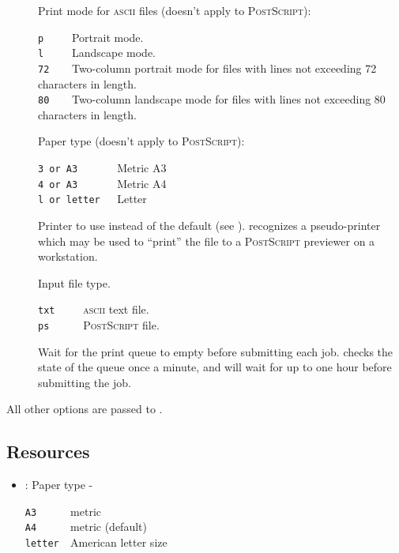 \begin{description}
\item[]
   Print mode for \textsc{ascii} files (doesn't apply to \textsc{PostScript}):

   \verb+p     +Portrait mode.\\
   \verb+l     +Landscape mode.\\
   \verb+72    +Two-column portrait mode for files with lines not exceeding 72
                characters in length.\\
   \verb+80    +Two-column landscape mode for files with lines not exceeding 80
                characters in length.

\item[]
   Paper type (doesn't apply to \textsc{PostScript}):

   \verb+3 or A3       +Metric A3\\
   \verb+4 or A3       +Metric A4\\
   \verb+l or letter   +Letter

\item[]
   Printer to use instead of the default (see ).
    recognizes a  pseudo-printer which may be used to
   ``print'' the file to a  \textsc{PostScript} previewer
   on a workstation.

\item[]
   Input file type.

   \verb+txt     +\textsc{ascii} text file.\\
   \verb+ps      +\textsc{PostScript} file.

\item[]
   Wait for the print queue to empty before submitting each job.  
   checks the state of the queue once a minute, and will wait for up to one
   hour before submitting the job.
\end{description}

\noindent
All other options are passed to .

\subsection*{Resources}

\begin{itemize}
\item
   : Paper type -

   \verb+A3      +metric \\
   \verb+A4      +metric  (default)\\
   \verb+letter  +American letter size
\end{itemize}

